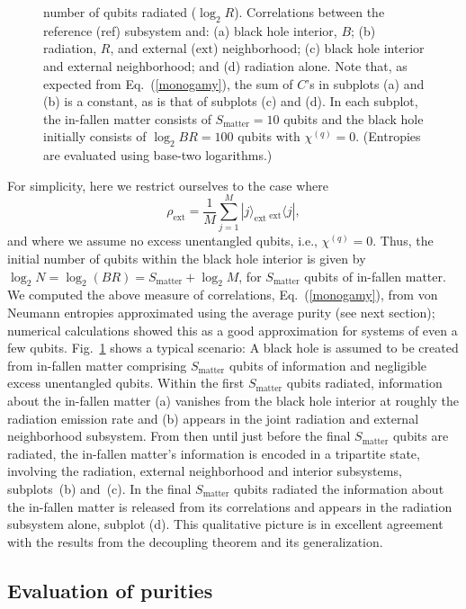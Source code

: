 \documentclass[twocolumn,aps,showpacs,prl]{revtex4}
\begin{document}
\begin{figure}[ht]
{number of qubits radiated ($\log_2 R$). Correlations between the reference
(ref) subsystem and: (a) black hole interior, $B$; (b) radiation, $R$,
and external ($\text{ext}$) neighborhood; (c) black hole interior
and external neighborhood; and (d) radiation alone. Note that, as
expected from Eq.~(\ref{monogamy}), the sum of $C$'s in subplots (a)
and (b) is a constant, as is that of subplots (c) and (d). In each
subplot, the in-fallen matter consists of $S_{\text{matter}}= 10$ qubits and
the black hole initially consists of $\log_2 BR = 100$ qubits
with $\chi^{(q)}=0$. (Entropies are evaluated using base-two logarithms.)}
\label{results}
\end{figure}

For simplicity, here we restrict ourselves to the case where
\begin{equation}
\rho_{\text{ext}}=\frac{1}{M}\sum_{j=1}^M
 |j\rangle_{\text{ext}}\,{}_{\text{ext}}\!\langle j|,
\end{equation}
and where we assume no excess unentangled qubits, i.e., $\chi^{(q)}=0$.
Thus, the initial number of qubits within the black hole interior is
given by $\log_2 N =\log_2(BR)=S_{\text{matter}}+\log_2 M$, for
$S_{\text{matter}}$ qubits of in-fallen matter. We computed the above
measure of correlations, Eq.~(\ref{monogamy}), from von Neumann
entropies approximated using the average purity (see next section);
numerical calculations showed this as a good approximation
for systems of even a few qubits. Fig.~\ref{results} shows a typical
scenario: A black hole is assumed to be created from in-fallen matter
comprising $S_{\text{matter}}$ qubits of information and
negligible excess unentangled qubits. Within the first $S_{\text{matter}}$
qubits radiated, information about the in-fallen matter (a) vanishes
from the black hole interior at roughly the radiation emission rate
and (b) appears in the joint radiation and external neighborhood
subsystem. From then until just before the final $S_{\text{matter}}$
qubits are radiated, the in-fallen matter's information is encoded in
a tripartite state, involving the radiation, external neighborhood
and interior subsystems, subplots~(b) and~(c). In the final
$S_{\text{matter}}$ qubits radiated the information about the
in-fallen matter is released from its correlations and appears in the
radiation subsystem alone, subplot (d). This qualitative picture is
in excellent agreement with the results from the decoupling
theorem and its generalization.

\subsection*{Evaluation of purities}
\label{purities}
\end{document}
